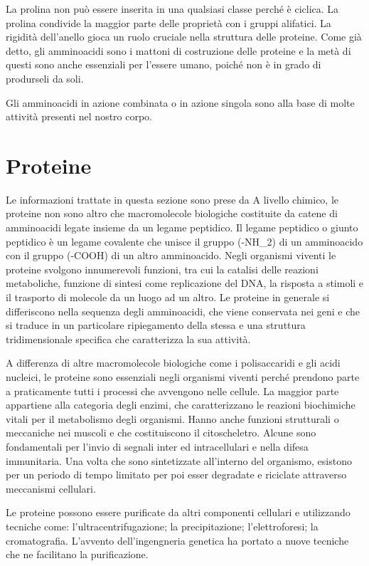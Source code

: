 La prolina non può essere inserita in una qualsiasi classe perché è ciclica. La prolina condivide la maggior parte delle proprietà 
con i gruppi alifatici. La rigidità dell'anello gioca un ruolo cruciale nella struttura delle proteine. Come già detto, 
gli amminoacidi sono i mattoni di costruzione delle proteine e la metà di questi sono anche essenziali per l'essere umano, 
poiché non è in grado di produrseli da soli.  

Gli amminoacidi in azione combinata o in azione singola sono alla base di molte attività presenti nel nostro corpo.


\section{Proteine}\label{sec:cap_sec_subsec}
Le informazioni trattate in questa sezione sono prese da \cite{WikiProteine}
A livello chimico, le proteine non sono altro che macromolecole biologiche costituite da catene di amminoacidi legate insieme da un legame peptidico. Il legame 
peptidico o giunto peptidico è un legame covalente che unisce il gruppo (-NH\_2) di un amminoacido con il gruppo (-COOH) di un altro amminoacido. Negli organismi 
viventi le proteine svolgono innumerevoli funzioni, tra cui la catalisi delle reazioni metaboliche, funzione di sintesi come replicazione del DNA, la risposta a 
stimoli e il trasporto di molecole da un luogo ad un altro. Le proteine in generale si differiscono nella sequenza degli amminoacidi, che viene conservata nei geni 
e che si traduce in un particolare ripiegamento della stessa e una struttura tridimensionale specifica che caratterizza la sua attività.

A differenza di altre macromolecole biologiche come i polisaccaridi e gli acidi nucleici, le proteine sono essenziali negli organismi viventi perché prendono parte 
a praticamente tutti i processi che avvengono nelle cellule. La maggior parte appartiene alla categoria degli enzimi, che caratterizzano le reazioni biochimiche 
vitali per il metabolismo degli organismi. Hanno anche funzioni strutturali o meccaniche nei muscoli e che costituiscono il citoscheletro. Alcune sono fondamentali 
per l'invio di segnali inter ed intracellulari e nella difesa immunitaria. Una volta che sono sintetizzate all'interno del organismo, esistono per un periodo di 
tempo limitato per poi esser degradate e riciclate attraverso meccanismi cellulari. 

Le proteine possono essere purificate da altri componenti cellulari e utilizzando tecniche come: l'ultracentrifugazione; la precipitazione; l'elettroforesi; 
la cromatografia. L'avvento dell'ingengneria genetica ha portato a nuove tecniche che ne facilitano la purificazione. 

